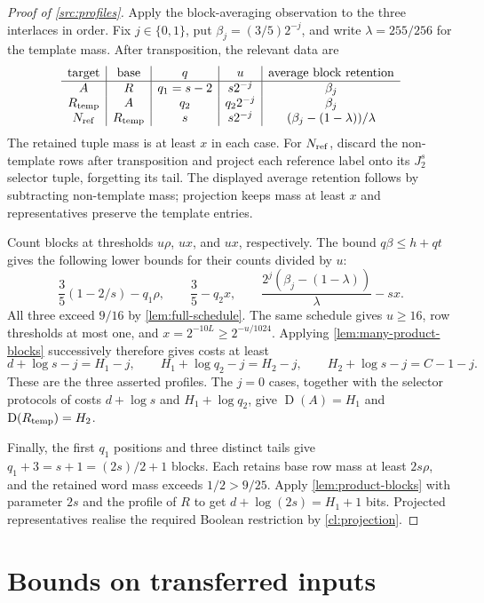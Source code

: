 \documentclass[11pt]{article} \usepackage[utf8]{inputenc}
\theoremstyle{plain} \newtheorem{theorem}{Theorem}[section]
\theoremstyle{definition} \newaliascnt{definition}{theorem}
\newcommand{\D}{\operatorname{D}}
\begin{document}
\begin{proof}[Proof of \cref{src:profiles}]
Apply the block-averaging observation to the three interlaces in order.
Fix $j\in\{0,1\}$,
put $\beta_j=(3/5)2^{-j}$, and write $\lambda=255/256$ for the template mass.
After transposition, the relevant data are
\[
\begin{array}{c|c|c|c|c}
\text{target}&\text{base}&q&u&\text{average block retention}\\ \hline
A&R&q_1=s-2&s2^{-j}&\beta_j\\
R_{\rm temp}&A&q_2&q_2 2^{-j}&\beta_j\\
N_{\rm ref}&R_{\rm temp}&s&s2^{-j}&(\beta_j-(1-\lambda))/\lambda
\end{array}
\]
The retained tuple mass is at least $x$ in each case. For $N_{\rm ref}$,
discard the non-template rows after transposition and project each reference
label onto its $J_2^s$ selector tuple, forgetting its tail. The displayed
average retention follows by subtracting non-template mass; projection keeps
mass at least $x$ and representatives preserve the template entries.

Count blocks at thresholds $u\rho$, $ux$, and $ux$, respectively.
The bound $q\beta\le h+qt$ gives the following lower bounds for
their counts divided by $u$:
\[
\frac35(1-2/s)-q_1\rho,\qquad
\frac35-q_2x,\qquad
\frac{2^j(\beta_j-(1-\lambda))}{\lambda}-sx.
\]
All three exceed $9/16$ by \cref{lem:full-schedule}. The same schedule gives
$u\ge16$, row thresholds at most one, and
$x=2^{-10L}\ge2^{-u/1024}$. Applying \cref{lem:many-product-blocks}
successively therefore gives costs at least
\[
d+\log s-j=H_1-j,\qquad
H_1+\log q_2-j=H_2-j,\qquad
H_2+\log s-j=C-1-j.
\]
These are the three asserted profiles. The $j=0$ cases, together with the
selector protocols of costs $d+\log s$ and $H_1+\log q_2$, give
$\D(A)=H_1$ and $\D(R_{\rm temp})=H_2$.

Finally, the first $q_1$ positions and three distinct tails give
$q_1+3=s+1=(2s)/2+1$ blocks. Each retains base row mass at least $2s\rho$,
and the retained word mass exceeds $1/2>9/25$. Apply
\cref{lem:product-blocks} with parameter $2s$ and the profile of $R$ to get
$d+\log(2s)=H_1+1$ bits. Projected representatives realise the required
Boolean restriction by \cref{cl:projection}.
\end{proof}

\section{Bounds on transferred inputs}\label{sec:mass-details}
\label{sec:mass_bounds}
\end{document}
